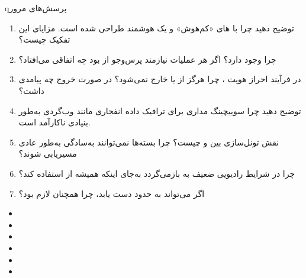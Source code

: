 
\begin{CNbox}[unbreakable]{q}{پرسش‌های مرور}

\begin{enumerate}
\def\labelenumi{\arabic{enumi}.}
\tightlist
\item
  توضیح دهید چرا  با های «کم‌هوش» و یک  هوشمند طراحی شده است. مزایای این تفکیک چیست؟
\item
  چرا  وجود دارد؟ اگر هر عملیات نیازمند پرس‌وجو از  بود چه اتفاقی می‌افتاد؟
\item
  در فرآیند احراز هویت ، چرا  هرگز از  یا  خارج نمی‌شود؟ در صورت خروج چه پیامدی داشت؟
\item
  توضیح دهید چرا سوییچینگ مداری برای ترافیک داده انفجاری مانند وب‌گردی به‌طور بنیادی ناکارآمد است.
\item
  نقش تونل‌سازی  بین  و  چیست؟ چرا بسته‌ها نمی‌توانند به‌سادگی به‌طور عادی مسیریابی شوند؟
\item
  چرا  در شرایط رادیویی ضعیف به  بازمی‌گردد به‌جای اینکه همیشه از  استفاده کند؟
\item
  اگر  می‌تواند به حدود  دست یابد، چرا همچنان  لازم بود؟
\end{enumerate}

\end{CNbox}


\begin{itemize}
\tightlist
\item
\item
\item
\item
\item
\item
\end{itemize}
